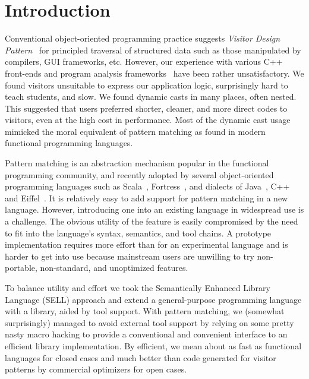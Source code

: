 \section{Introduction} %
\label{sec:intro}

Conventional object-oriented programming practice suggests \emph{Visitor Design 
Pattern}~\cite{DesignPatterns} for principled traversal of structured data such 
as those manipulated by compilers, GUI frameworks, etc. However, our experience 
with various C++ front-ends and program analysis frameworks~\cite{Pivot09,Phoenix,Clang} 
have been rather unsatisfactory. We found visitors unsuitable to express our 
application logic, surprisingly hard to teach students, and slow. We found 
dynamic casts in many places, often nested. This suggested that users preferred 
shorter, cleaner, and more direct codes to visitors, even at the high cost in 
performance. Most of the dynamic cast usage mimicked the moral equivalent of 
pattern matching as found in modern functional programming languages.

Pattern matching is an abstraction mechanism popular in the functional
programming community, and recently adopted by several object-oriented
programming languages such as Scala~\cite{Scala2nd}, Fortress~\cite{RPS10},
and dialects of Java~\cite{Odersky97pizzainto,Liu03jmatch:iterable,HydroJ2003}, 
C++\cite{Prop96} and Eiffel~\cite{Moreau:2003}. It is relatively easy to add 
support for pattern matching in a new language. However, introducing one into an
existing language in widespread use is a challenge. The obvious utility of the 
feature is easily compromised by the need to fit into the language's syntax, 
semantics, and tool chains. A prototype implementation requires more effort than 
for an experimental language and is harder to get into use because mainstream 
users are unwilling to try non-portable, non-standard, and unoptimized features. 

To balance utility and effort we took the Semantically 
Enhanced Library Language (SELL) approach\cite{SELL} and extend a
general-purpose programming language with a library, aided by tool 
support. With pattern matching, we (somewhat surprisingly) managed to avoid 
external tool support by relying on some pretty nasty macro hacking to provide a
conventional and convenient interface to an efficient library implementation.
By efficient, we mean about as fast as functional languages for closed cases and
much better than code generated for visitor patterns by commercial optimizers 
for open cases\cite{TypeSwitch}.

